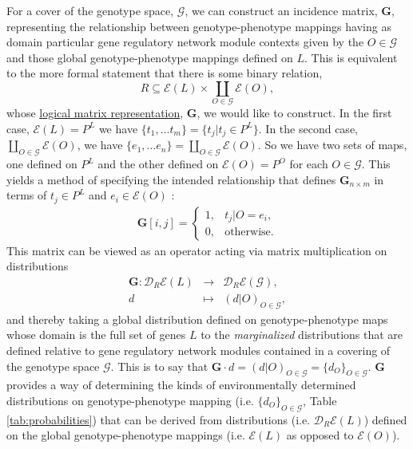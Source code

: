 \documentclass[10pt]{article}
\begin{document}
For a cover of the genotype space, $\mathcal{G}$, we can construct an incidence matrix, $\mathbf{G}$, representing the relationship between genotype-phenotype mappings having as domain particular gene regulatory network module contexts given by the $O \in \mathcal{G}$ and those global genotype-phenotype mappings defined on $L$. This is equivalent to the more formal statement that there is some binary relation,
\begin{equation}
R \subseteq \mathcal{E}(L) \times \coprod_{O \in \mathcal{G}} \mathcal{E}(O),
\end{equation}
whose \href{http://en.wikipedia.org/wiki/Logical_matrix#Matrix_representation_of_a_relation}{logical matrix representation}, $\mathbf{G}$, we would like to construct. In the first case, $\mathcal{E}(L) = P^L$ we have $\{t_1, \ldots t_m\} = \{t_j | t_j \in P^L\}$. In the second case, $\coprod_{O \in \mathcal{G}} \mathcal{E}(O)$, we have $\{e_1, \ldots e_n\} = \coprod_{O \in \mathcal{G}} \mathcal{E}(O)$. So we have two sets of maps, one defined on $P^L$ and the other defined on $\mathcal{E}(O) = P^O$ for each $O \in \mathcal{G}$. This yields a method of specifying the intended relationship that defines $\mathbf{G}_{n \times m}$ in terms of $t_j \in P^L$ and $e_i \in \mathcal{E}(O)$ :
\begin{eqnarray}
\mathbf{G}[i,j] =
\begin{cases}
1, & t_j|O = e_i,\\
0, & \text{otherwise}.
\end{cases}
\end{eqnarray}
This matrix can be viewed as an operator acting via matrix multiplication on distributions
\begin{eqnarray*}
\mathbf{G} \colon \mathcal{D}_R\mathcal{E}(L) &\rightarrow& \mathcal{D}_R\mathcal{E}(\mathcal{G}),\\
d &\mapsto& (d|O)_{O \in \mathcal{G}},
\end{eqnarray*}
and thereby taking a global distribution defined on genotype-phenotype maps whose domain is the full set of genes $L$ to the \emph{marginalized} distributions that are defined relative to gene regulatory network modules contained in a covering of the genotype space $\mathcal{G}$. This is to say that $\mathbf{G} \cdot d = (d|O)_{O \in \mathcal{G}} = \{d_O\}_{O \in \mathcal{G}}$. $\mathbf{G}$ provides a way of determining the kinds of environmentally determined distributions on genotype-phenotype mapping (i.e. $\{d_O\}_{O \in \mathcal{G}}$, Table \ref{tab:probabilities}) that can be derived from distributions (i.e. $\mathcal{D}_R \mathcal{E}(L)$) defined on the global genotype-phenotype mappings (i.e. $\mathcal{E}(L)$ as opposed to $\mathcal{E}(O)$).
\end{document}
